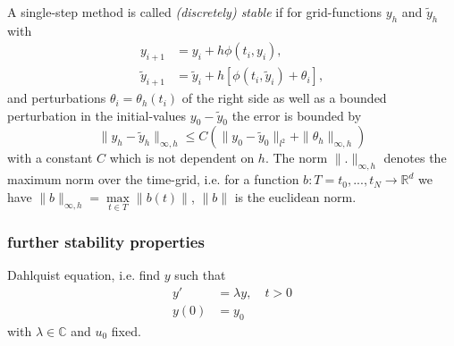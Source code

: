 	\begin{frame}
		\begin{definition}\label{Discrete_Stability_SingleStep - lecture notes for numpdgl}
			A single-step method is called \emph{(discretely) stable} if for grid-functions $y_h$ and $\tilde{y}_h$ with
			\begin{align}
				y_{i+1} &= y_i + h \phi(t_i, y_i), \\
				\tilde{y}_{i+1} &=  \tilde{y}_i + h [\phi(t_i, \tilde{y}_i) + \theta_i],
			\end{align}
			and perturbations $\theta_i = \theta_h(t_i)$ of the right side as well as a bounded perturbation in the initial-values $y_0 - \tilde{y}_0$ the error is bounded by
			\begin{displaymath}
				\|y_h - \tilde{y}_h\|_{\infty,h} \leq C (\|y_0 - \tilde{y}_0\|_{l^2} + \|\theta_h\|_{\infty,h})
			\end{displaymath}
			with a constant $C$ which is not dependent on $h$. The norm $\|.\|_{\infty,h}$ denotes the maximum norm over the time-grid, i.e. for a function $b: T={t_0,...,t_N} \to \mathbb{R}^d$ we have $\|b\|_{\infty,h} = \max\limits_{t \in T}\|b(t)\|$, $\|b\|$ is the euclidean norm.
		\end{definition}
	\end{frame}
	
	\subsubsection{further stability properties}
	
	\begin{frame}
		 Dahlquist equation, i.e. find $y$ such that
		\begin{align}
			y' &= \lambda y, \quad t > 0 \\
			y(0) &= y_0
		\end{align}
		with $\lambda \in \mathbb{C}$ and $u_0$ fixed.
	\end{frame}
	
